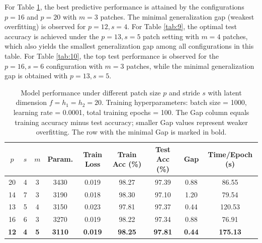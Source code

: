 \documentclass[pdflatex,sn-mathphys-num]{sn-jnl}%
\theoremstyle{thmstyleone}%
\theoremstyle{thmstyletwo}%
\theoremstyle{thmstylethree}%
\begin{document}
For Table \ref{tab:8}, the best predictive performance is attained by the configurations $p=16$ and $p=20$ with $m=3$ patches. The minimal generalization gap (weakest overfitting) is observed for $p=12, s=4$.
For Table \ref{tab:9}, the optimal test accuracy is achieved under the $p=13, s=5$ patch setting with $m=4$ patches, which also yields the smallest generalization gap among all configurations in this table.
For Table \ref{tab:10}, the top test performance is observed for the $p=16, s=6$ configuration with $m=3$ patches, while the minimal generalization gap is obtained with $p=13, s=5$.


   \begin{table}[htbp]
  \centering
  \caption{Model performance under different patch size $p$ and stride $s$ with latent dimension $f=h_1=h_2=20$. Training hyperparameters: batch size = 1000, learning rate = 0.0001, total training epochs = 100. The Gap column equals training accuracy minus test accuracy; smaller Gap values represent weaker overfitting. The row with the minimal Gap is marked in bold.}
  \label{tab:8}
  \begin{tabular}{ccccccccc}
    \toprule
    $p$ & $s$ & $m$ & Param. & Train Loss & Train Acc (\%) & Test Acc (\%) & Gap & Time/Epoch (s) \\
    \midrule
20 & 4 & 3 & 3430 & 0.019 & 98.27 & 97.39 & 0.88 & 86.55 \\
14 & 7 & 3 & 3190 & 0.018 & 98.30 & 97.10 & 1.20 & 79.54 \\
13 & 5 & 4 & 3150 & 0.023 & 97.81 & 97.37 & 0.44 & 120.53 \\
16 & 6 & 3 & 3270 & 0.019 & 98.22 & 97.34 & 0.88 & 76.91 \\
\textbf{12} & \textbf{4} & \textbf{5} & \textbf{3110} & \textbf{0.019} & \textbf{98.25} & \textbf{97.81} & \textbf{0.44} & \textbf{175.13} \\
    \bottomrule
  \end{tabular}
\end{table}
\end{document}
